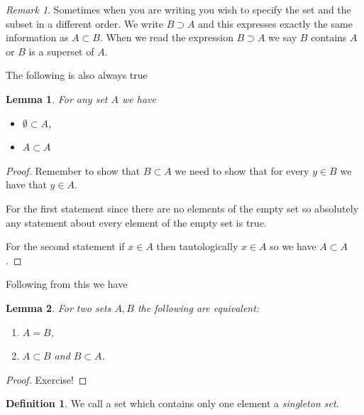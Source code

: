 \documentclass[
]{book}
\newtheorem{lemma}{Lemma}[chapter]
\theoremstyle{definition}
\newtheorem{definition}{Definition}[chapter]
\theoremstyle{definition}
\theoremstyle{definition}
\theoremstyle{definition}
\theoremstyle{remark}
\newtheorem*{remark}{Remark}
\begin{document}
\begin{remark}
Sometimes when you are writing you wish to specify the set and the subset in a different order. We write \(B \supset A\) and this expresses exactly the same information as \(A \subset B\). When we read the expression \(B \supset A\) we say \(B\) contains \(A\) or \(B\) is a superset of \(A\).
\end{remark}

The following is also always true

\begin{lemma}

For any set \(A\) we have

\begin{itemize}
\item
  \(\emptyset \subset A\),
\item
  \(A \subset A\)
\end{itemize}

\end{lemma}

\begin{proof}
Remember to show that \(B \subset A\) we need to show that for every \(y \in B\) we have that \(y \in A\).

For the first statement since there are no elements of the empty set so absolutely any statement about every element of the empty set is true.

For the second statement if \(x \in A\) then tautologically \(x \in A\) so we have \(A \subset A\).
\end{proof}

Following from this we have

\begin{lemma}

For two sets \(A, B\) the following are equivalent:

\begin{enumerate}
\def\labelenumi{\arabic{enumi}.}
\item
  \(A = B\),
\item
  \(A \subset B\) and \(B \subset A\).
\end{enumerate}

\end{lemma}

\begin{proof}
Exercise!
\end{proof}

\begin{definition}
We call a set which contains only one element a \emph{singleton set}.
\end{definition}
\end{document}
